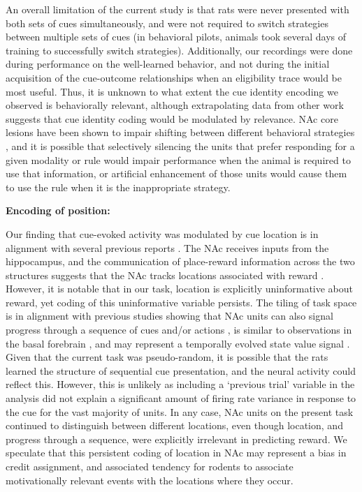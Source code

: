 \documentclass[11pt]{article}
\let\cite=\citep
\begin{document}
An overall limitation of the current study is that rats were never
presented with both sets of cues simultaneously, and were not required
to switch strategies between multiple sets of cues (in behavioral
pilots, animals took several days of training to successfully switch
strategies). Additionally, our recordings were done during performance
on the well-learned behavior, and not during the initial acquisition
of the cue-outcome relationships when an eligibility trace would be
most useful. Thus, it is unknown to what extent the cue identity
encoding we observed is behaviorally relevant, although extrapolating
data from other work \cite{Sleezer2016} suggests that cue identity
coding would be modulated by relevance. NAc core lesions have been
shown to impair shifting between different behavioral strategies
\cite{Floresco2006a}, and it is possible that selectively silencing
the units that prefer responding for a given modality or rule would
impair performance when the animal is required to use that
information, or artificial enhancement of those units would cause them
to use the rule when it is the inappropriate strategy.

{\bf Encoding of position:}

Our finding that cue-evoked activity was modulated by cue location is
in alignment with several previous reports
\cite{Lavoie1994,Wiener2003,Mulder2005,Strait2016}. The NAc receives
inputs from the hippocampus, and the communication of place-reward
information across the two structures suggests that the NAc tracks
locations associated with reward
\cite{Tabuchi2000,Pennartz2004,Lansink2008,Lansink2009,VanderMeer2011,Lansink2016,Sjulson2017}. However,
it is notable that in our task, location is explicitly uninformative
about reward, yet coding of this uninformative variable persists. The
tiling of task space is in alignment with previous studies showing
that NAc units can also signal progress through a sequence of cues
and/or actions
\cite{Shidara1998,Mulder2004,Khamassi2008,Berke2009,Lansink2012,Atallah2014},
is similar to observations in the basal forebrain \cite{Tingley2018}, and
may represent a temporally evolved state value signal
\cite{Pennartz2011,Hamid2016}. Given that the current task was
pseudo-random, it is possible that the rats learned the structure of
sequential cue presentation, and the neural activity could reflect
this. However, this is unlikely as including a ‘previous trial’
variable in the analysis did not explain a significant amount of
firing rate variance in response to the cue for the vast majority of
units. In any case, NAc units on the present task continued to
distinguish between different locations, even though location, and
progress through a sequence, were explicitly irrelevant in predicting
reward. We speculate that this persistent coding of location in NAc
may represent a bias in credit assignment, and associated tendency for
rodents to associate motivationally relevant events with the locations
where they occur.
\end{document}
